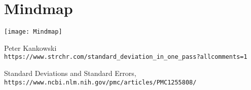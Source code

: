 \documentclass[11pt]{report}
\begin{document}
\section{Mindmap}
\begin{center}
\texttt{[image: Mindmap]}
\end{center}


\begin{thebibliography}{9}
Peter Kankowski
\\\texttt{https://www.strchr.com/standard\_deviation\_in\_one\_pass?allcomments=1}

Standard Deviations and Standard Errors,
\\\texttt{https://www.ncbi.nlm.nih.gov/pmc/articles/PMC1255808/}


\end{thebibliography}
\end{document}
